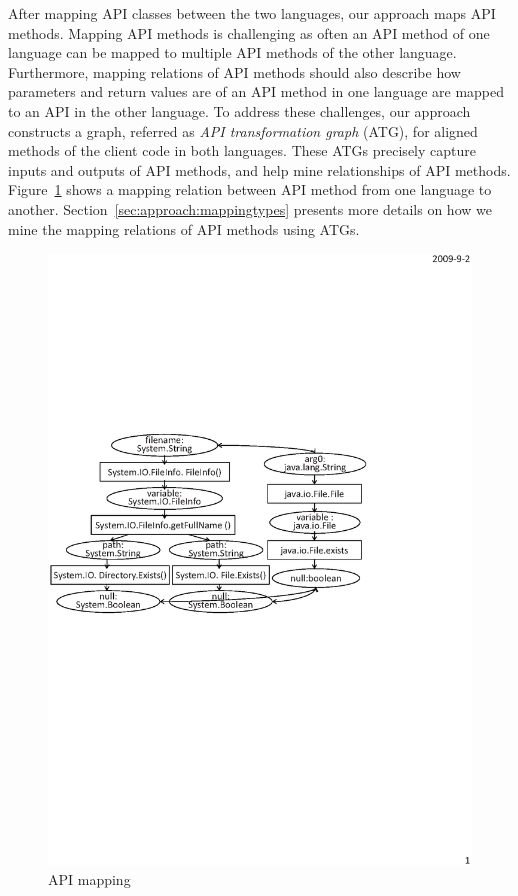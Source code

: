 After mapping API classes between the two languages, our approach maps
API methods. Mapping API methods is challenging as often an API method of one language
can be mapped to multiple API methods of the other language. Furthermore,
mapping relations of API methods should also describe how parameters and return
values are of an API method in one language are mapped to an API in the other
language. To address these challenges, our approach constructs a
graph, referred as \emph{API transformation graph} (ATG), for
aligned methods of the client code in both languages. These ATGs
precisely capture inputs and outputs of API methods, and help mine
relationships of API methods. Figure~\ref{fig:example} shows a mapping
relation between API method  from one language to another.
Section~\ref{sec:approach:mappingtypes} presents more details on how we mine the mapping relations
of API methods using ATGs.

\begin{figure}[t]
\centering
\includegraphics[scale=0.65,clip]{figure/sample.eps}\vspace*{-3ex}
 \caption
{\label{fig:example}API mapping}\vspace*{-3ex}
\end{figure}

